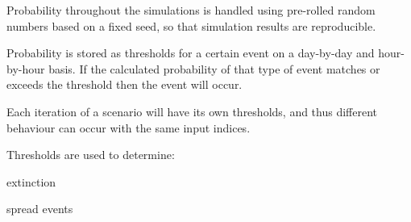 Probability throughout the simulations is handled using pre-\/rolled random numbers based on a fixed seed, so that simulation results are reproducible.

Probability is stored as \textquotesingle{}thresholds\textquotesingle{} for a certain event on a day-\/by-\/day and hour-\/by-\/hour basis. If the calculated probability of that type of event matches or exceeds the threshold then the event will occur.

Each iteration of a scenario will have its own thresholds, and thus different behaviour can occur with the same input indices.

Thresholds are used to determine\+:
\begin{DoxyItemize}
\item extinction
\item spread events 
\end{DoxyItemize}